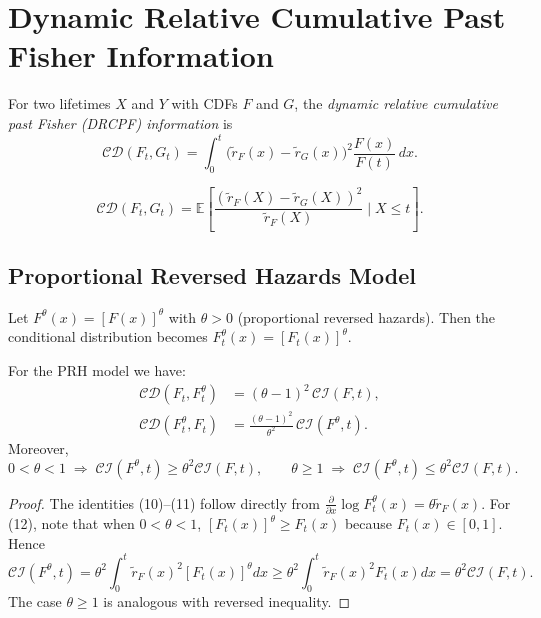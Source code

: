 \documentclass[twoside]{article}
\begin{document}
\section{Dynamic Relative Cumulative Past Fisher Information}\label{DRCP}

\begin{dfn}
	For two lifetimes $X$ and $Y$ with CDFs $F$ and $G$, the \emph{dynamic relative cumulative past Fisher (DRCPF) information} is
	\begin{equation}
	\mathcal{CD}(F_t,G_t)=\int_0^t \bigl(\tilde{r}_F(x)-\tilde{r}_G(x)\bigr)^2 \frac{F(x)}{F(t)}\,dx. \tag{8}
	\end{equation}
\end{dfn}

\begin{pro}
	\begin{equation}
		\mathcal{CD}(F_t,G_t)=\mathbb{E}\left[\frac{(\tilde{r}_F(X)-\tilde{r}_G(X))^2}{\tilde{r}_F(X)}\;\Big|\;X\le t\right].\nonumber \tag{9}
	\end{equation}
\end{pro}
\subsection{Proportional Reversed Hazards Model}

Let $F^\theta(x)=[F(x)]^\theta$ with $\theta>0$ (proportional reversed hazards). Then the conditional distribution becomes $F_t^\theta(x)=[F_t(x)]^\theta$.
\begin{thm}
	For the PRH model we have:
	\begin{align}
	\mathcal{CD}(F_t,F_t^\theta) &= (\theta-1)^2\,\mathcal{CI}(F,t), \tag{10}\\
	\mathcal{CD}(F_t^\theta,F_t) &= \frac{(\theta-1)^2}{\theta^2}\,\mathcal{CI}(F^\theta,t). \tag{11}
	\end{align}
	Moreover,
	\begin{equation}
		0<\theta<1 \;\Longrightarrow\; \mathcal{CI}(F^\theta,t)\ge \theta^2\mathcal{CI}(F,t),\qquad
	\theta\ge 1 \;\Longrightarrow\; \mathcal{CI}(F^\theta,t)\le \theta^2\mathcal{CI}(F,t). \nonumber
	\end{equation}
\end{thm}
\begin{proof}
	The identities (10)–(11) follow directly from $\frac{\partial}{\partial x}\log F_t^\theta(x)=\theta\tilde{r}_F(x)$. For (12), note that when $0<\theta<1$, $[F_t(x)]^\theta\ge F_t(x)$ because $F_t(x)\in[0,1]$. Hence
	\[
	\mathcal{CI}(F^\theta,t)=\theta^2\int_0^t \tilde{r}_F(x)^2 [F_t(x)]^\theta dx \ge \theta^2\int_0^t \tilde{r}_F(x)^2 F_t(x)dx = \theta^2\mathcal{CI}(F,t).
	\]
	The case $\theta\ge1$ is analogous with reversed inequality.
\end{proof}
\end{document}
